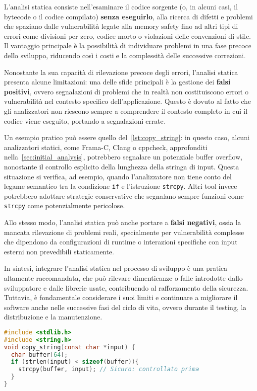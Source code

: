 L'analisi statica consiste nell'esaminare il codice sorgente (o, in alcuni casi,
il bytecode o il codice compilato) \textbf{senza eseguirlo}, alla ricerca di difetti
e problemi che spaziano dalle vulnerabilità legate alla memory safety fino ad altri
tipi di errori come divisioni per zero, codice morto o violazioni delle
convenzioni di stile. Il vantaggio principale è la possibilità di individuare problemi
in una fase precoce dello sviluppo, riducendo così i costi e la complessità
delle successive correzioni.

Nonostante la sua capacità di rilevazione precoce degli errori, l'analisi statica
presenta alcune limitazioni: una delle sfide principali è la gestione dei
\textbf{falsi positivi}, ovvero segnalazioni di problemi che in realtà non
costituiscono errori o vulnerabilità nel contesto specifico dell'applicazione. Questo
è dovuto al fatto che gli analizzatori non riescono sempre a comprendere il contesto
completo in cui il codice viene eseguito, portando a segnalazioni errate.

Un esempio pratico può essere quello del~\autoref{lst:copy_string}: in questo caso,
alcuni analizzatori statici, come Frama-C, Clang o cppcheck, approfonditi nella~\autoref{sec:initial_analysis},
potrebbero segnalare un potenziale buffer overflow, nonostante il controllo esplicito
della lunghezza della stringa di input. Questa situazione si verifica, ad esempio,
quando l'analizzatore non tiene conto del legame semantico tra la condizione
\texttt{if} e l'istruzione \texttt{strcpy}. Altri tool invece potrebbero adottare
strategie conservative che segnalano sempre funzioni come \texttt{strcpy} come
potenzialmente pericolose.

Allo stesso modo, l'analisi statica può anche portare a \textbf{falsi negativi},
ossia la mancata rilevazione di problemi reali, specialmente per vulnerabilità
complesse che dipendono da configurazioni di runtime o interazioni specifiche
con input esterni non prevedibili staticamente.

In sintesi, integrare l'analisi statica nel processo di sviluppo è una pratica altamente
raccomandata, che può rilevare dimenticanze o falle introdotte dallo
sviluppatore e dalle librerie usate, contribuendo al rafforzamento della sicurezza.
Tuttavia, è fondamentale considerare i suoi limiti e continuare a migliorare il software
anche nelle successive fasi del ciclo di vita, ovvero durante il testing, la distribuzione
e la manutenzione.

\bigskip
\begin{lstlisting}[language=C, caption={Copia sicura di una stringa con \texttt{strcpy()}}, label={lst:copy_string}]
#include <stdlib.h>
#include <string.h>
void copy_string(const char *input) {
  char buffer[64];
  if (strlen(input) < sizeof(buffer)){
    strcpy(buffer, input); // Sicuro: controllato prima
  }
}
\end{lstlisting}